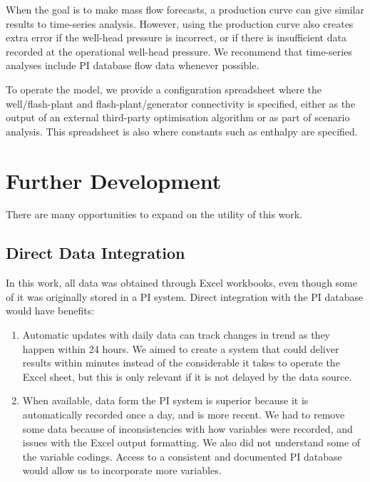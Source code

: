 \documentclass[a4paper, 12pt]{article}
\begin{document}
When the goal is to make mass flow forecasts, a production curve can give similar results to time-series analysis. However, using the production curve also creates extra error if the well-head pressure is incorrect, or if there is insufficient data recorded at the operational well-head pressure. We recommend that time-series analyses include PI database flow data whenever possible.

To operate the model, we provide a configuration spreadsheet where the well/flash-plant and flash-plant/generator connectivity is specified, either as the output of an external third-party optimisation algorithm or as part of scenario analysis. This spreadsheet is also where constants such as enthalpy are specified. 


\section{Further Development}
There are many opportunities to expand on the utility of this work.

\subsection{Direct Data Integration}
In this work, all data was obtained through Excel workbooks, even though some of it was originally stored in a PI system. Direct integration with the PI database would have benefits:

\begin{enumerate}
\item Automatic updates with daily data can track changes in trend as they happen within 24 hours.  We aimed to create a system that could deliver results within minutes instead of the considerable it takes to operate the Excel sheet, but this is only relevant if it is not delayed by the data source.
\item When available, data form the PI system is superior because it is automatically recorded once a day, and is more recent. We had to remove some data because of inconsistencies with how variables were recorded, and issues with the Excel output formatting. We also did not understand some of the variable codings. Access to a consistent and documented PI database would allow us to incorporate more variables.
\end{enumerate}
\end{document}
